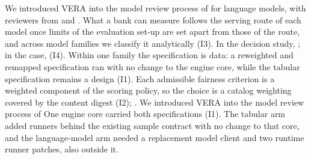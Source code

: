 
\ifarmwithdrawn
We introduced VERA into the model review process of \bankname{} for language models, with reviewers from \aicc{} and \legalrisk{}.
What a bank can measure follows the serving route of each model once limits of the evaluation set-up are set apart from those of the route, and across model families we classify it analytically (I3).
In the decision study, ; in the \aicc{} case,  (I4).
Within one family the specification is data: a reweighted and remapped specification ran with no change to the engine core, while the tabular specification remains a design (I1).
Each admissible fairness criterion is a weighted component of the scoring policy, so the choice is a catalog weighting covered by the content digest (I2); .
\else
We introduced VERA into the model review process of \bankname{} 
One engine core carried both specifications (I1).
The tabular arm added runners behind the existing sample contract with no change to that core, and the language-model arm needed a replacement model client and two runtime runner patches, also outside it.
